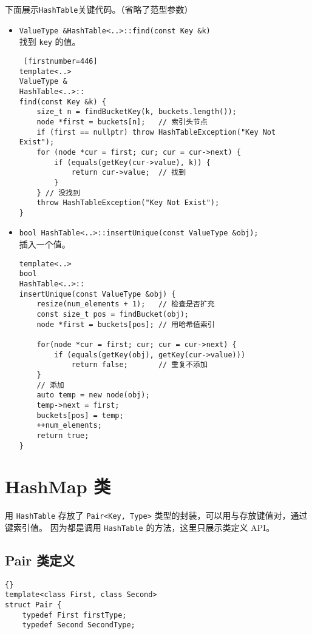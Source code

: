 {下面展示\lstinline{HashTable}关键代码。（省略了范型参数）

\begin{itemize}
      \item \lstinline{ValueType &HashTable<..>::find(const Key &k)}\\
            找到 \lstinline{key} 的值。
\begin{lstlisting} [firstnumber=446]
template<..>
ValueType &
HashTable<..>::
find(const Key &k) {
    size_t n = findBucketKey(k, buckets.length());
    node *first = buckets[n];   // 索引头节点
    if (first == nullptr) throw HashTableException("Key Not Exist");
    for (node *cur = first; cur; cur = cur->next) {
        if (equals(getKey(cur->value), k)) {
            return cur->value;  // 找到
        }
    } // 没找到
    throw HashTableException("Key Not Exist");
}\end{lstlisting}
      \item \lstinline{bool HashTable<..>::insertUnique(const ValueType &obj);} \\
            插入一个值。
\begin{lstlisting}[escapechar=^, firstnumber=409]
template<..>
bool
HashTable<..>::
insertUnique(const ValueType &obj) {
    resize(num_elements + 1);   // 检查是否扩充
    const size_t pos = findBucket(obj);
    node *first = buckets[pos]; // 用哈希值索引

    for(node *cur = first; cur; cur = cur->next) {
        if (equals(getKey(obj), getKey(cur->value)))
            return false;       // 重复不添加
    }
    // 添加
    auto temp = new node(obj);
    temp->next = first;
    buckets[pos] = temp;
    ++num_elements;
    return true;
}\end{lstlisting}
\end{itemize}


\section{HashMap 类}

用 \lstinline{HashTable} 存放了 \lstinline{Pair<Key, Type>} 类型的封装，可以用与存放键值对，通过键索引值。%
因为都是调用 \lstinline{HashTable} 的方法，这里只展示类定义 API。


\subsection{Pair 类定义}
\begin{lstlisting}[firstnumber=702, caption=Pair 类定义]{}
template<class First, class Second>
struct Pair {
    typedef First firstType;
    typedef Second SecondType;


\end{lstlisting}}
